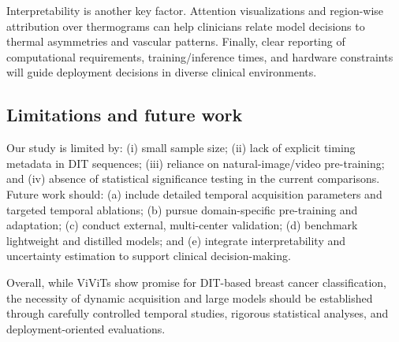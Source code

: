 Interpretability is another key factor. Attention visualizations and
region-wise attribution over thermograms can help clinicians relate
model decisions to thermal asymmetries and vascular patterns. Finally,
clear reporting of computational requirements, training/inference
times, and hardware constraints will guide deployment decisions in
diverse clinical environments.

\subsection{Limitations and future work}
Our study is limited by: (i) small sample size; (ii) lack of explicit
timing metadata in DIT sequences; (iii) reliance on
natural-image/video pre-training; and (iv) absence of statistical
significance testing in the current comparisons. Future work should:
(a) include detailed temporal acquisition parameters and targeted
temporal ablations; (b) pursue domain-specific pre-training and
adaptation; (c) conduct external, multi-center validation; (d)
benchmark lightweight and distilled models; and (e) integrate
interpretability and uncertainty estimation to support clinical
decision-making.

Overall, while ViViTs show promise for DIT-based breast cancer
classification, the necessity of dynamic acquisition and large models
should be established through carefully controlled temporal studies,
rigorous statistical analyses, and deployment-oriented evaluations.
